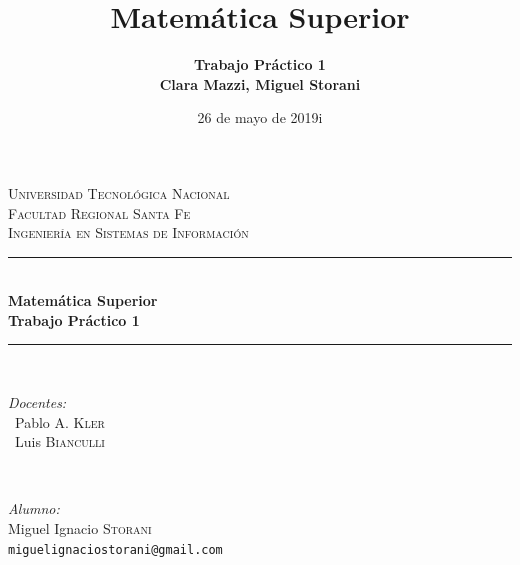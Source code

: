 \documentclass[12pt]{article}
\title{Matemática Superior}
\author{\bfseries{Trabajo Práctico 1}\\
Clara Mazzi, Miguel Storani}
\date{26 de mayo de 2019i}
\begin{document}
\pagestyle{empty}

\begin{titlepage}

\newcommand{\HRule}{\rule{\linewidth}{0.5mm}} %

\begin{center} %
 

\textsc{\LARGE Universidad Tecnológica Nacional}\\[0.5cm]				%
\textsc{\Large Facultad Regional Santa Fe}\\[1.5cm]						%
\textsc{\large Ingeniería en Sistemas de Información}\\[0.5cm]			%


\HRule \\[0.9cm]
{ \huge \bfseries Matemática Superior}\\[0.4cm]
{ \large \bfseries Trabajo Práctico 1}\\[0.7cm] %
\HRule \\[1.5cm]


\begin{minipage}{0.4\textwidth}
\begin{flushleft}\large
\emph{Docentes:} \\
\ Pablo A. \textsc{Kler}\\%
\ Luis \textsc{Bianculli}\\


\end{flushleft}
\end{minipage}
~
\begin{minipage}{0.4\textwidth}
\begin{flushright} \large
\emph{Alumno:}\\
Miguel Ignacio \textsc{Storani}\\%
{\small \texttt{miguelignaciostorani@gmail.com}}
\end{flushright}
\end{minipage}\\[3cm]



\end{center}
\end{titlepage}
\end{document}
